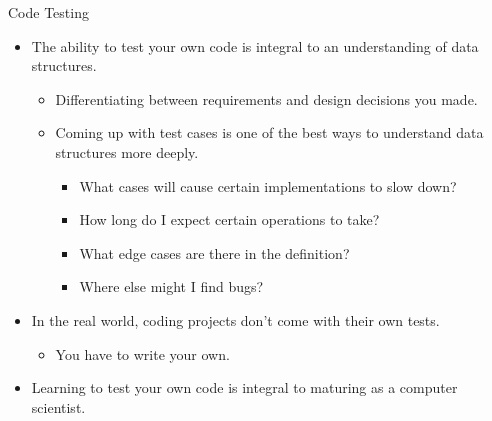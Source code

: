 \newpage
\begin{section}
    {Code Testing}
    \begin{itemize}
        \item The ability to test your own code is integral to an understanding of data structures.
        \begin{itemize}
            \item Differentiating between requirements and design decisions you made.
            \item Coming up with test cases is one of the best ways to understand data structures more deeply.
            \begin{itemize}
                \item What cases will cause certain implementations to slow down?
                \item How long do I expect certain operations to take?
                \item What edge cases are there in the definition?
                \item Where else might I find bugs?
            \end{itemize}
        \end{itemize}
        \item In the real world, coding projects don’t come with their own tests.
        \begin{itemize}
            \item You have to write your own.
        \end{itemize}
        \item Learning to test your own code is integral to maturing as a computer scientist.
    \end{itemize}
    

\end{section}
